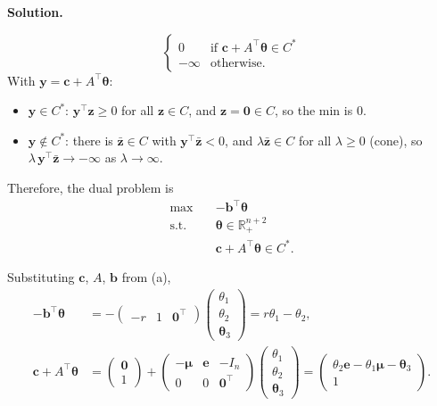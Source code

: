 \documentclass[10pt]{article}
\newenvironment{solution}
  {\par\smallskip\begingroup\color{solink}\textbf{Solution.}\ }
  {\par\endgroup}
\begin{document}
\begin{parts}
\begin{solution}
\begin{steps}
\[\begin{cases}
      0 & \text{if } \bm{c} + A^{\top}\bm{\theta} \in C^{*} \\
      -\infty & \text{otherwise.}
    \end{cases}
  \]
  With $\bm{y} = \bm{c} + A^{\top}\bm{\theta}$:
  \begin{itemize}[leftmargin=1.6em, itemsep=2pt, topsep=3pt, beginpenalty=10000]
    \item $\bm{y} \in C^{*}$: $\bm{y}^{\top}\bm{z} \ge 0$ for all $\bm{z} \in C$, and $\bm{z} = \bm{0} \in C$, so the min is $0$.
    \item $\bm{y} \notin C^{*}$: there is $\bar{\bm{z}} \in C$ with $\bm{y}^{\top}\bar{\bm{z}} < 0$, and $\lambda \bar{\bm{z}} \in C$ for all
      $\lambda \ge 0$ (cone), so $\lambda\, \bm{y}^{\top}\bar{\bm{z}} \to -\infty$ as $\lambda \to \infty$.
  \end{itemize}
  Therefore, the dual problem is
  \[
  \begin{aligned}
    \max \quad & -\bm{b}^{\top}\bm{\theta} \\
    \text{s.t.} \quad & \bm{\theta} \in \mathbb{R}^{n+2}_+ \\
                      & \bm{c} + A^{\top}\bm{\theta} \in C^{*} .
  \end{aligned}
  \]
\end{steps}
Substituting $\bm{c}$, $A$, $\bm{b}$ from (a),
\[
\begin{aligned}
  -\bm{b}^{\top}\bm{\theta} &= -\begin{pmatrix} -r & 1 & \bm{0}^{\top} \end{pmatrix}
      \begin{pmatrix} \theta_1 \\ \theta_2 \\ \bm{\theta}_3 \end{pmatrix}
    = r\theta_1 - \theta_2, \\[4pt]
  \bm{c} + A^{\top}\bm{\theta} &= \begin{pmatrix} \bm{0} \\ 1 \end{pmatrix}
    + \begin{pmatrix} -\bm{\mu} & \bm{e} & -I_n \\ 0 & 0 & \bm{0}^{\top} \end{pmatrix}
      \begin{pmatrix} \theta_1 \\ \theta_2 \\ \bm{\theta}_3 \end{pmatrix}
    = \begin{pmatrix} \theta_2 \bm{e} - \theta_1 \bm{\mu} - \bm{\theta}_3 \\ 1 \end{pmatrix}.

\end{aligned}\]
\end{solution}
\end{parts}
\end{document}
